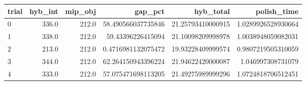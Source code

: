 \begin{tabular}{lrrrrr}
\hline
trial & hyb_int & mip_obj & gap_pct & hyb_total & polish_time \\ \hline
0 & 336.0 & 212.0 & 58.490566037735846 & 21.25793410000915 & 1.0289926528930664 \\
1 & 338.0 & 212.0 & 59.43396226415094 & 21.10098209998978 & 1.0038948059082031 \\
2 & 213.0 & 212.0 & 0.4716981132075472 & 19.93228409999574 & 0.9807219505310059 \\
3 & 344.0 & 212.0 & 62.264150943396224 & 21.94622420000087 & 1.046997308731079 \\
4 & 333.0 & 212.0 & 57.075471698113205 & 21.49275989999296 & 1.0724818706512451 \\
\hline
\end{tabular}
